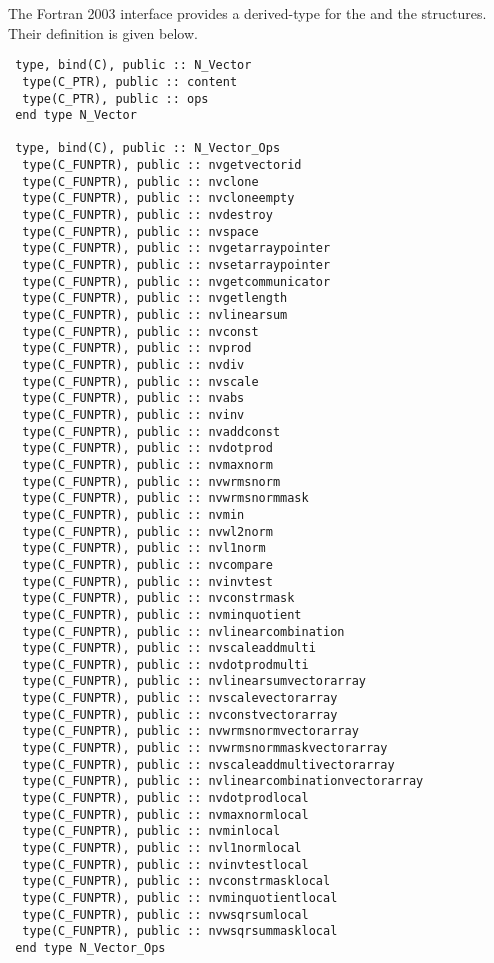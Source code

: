 The Fortran 2003 interface provides a  derived-type for the
 and the  structures.
Their definition is given below.
\begin{verbatim}
 type, bind(C), public :: N_Vector
  type(C_PTR), public :: content
  type(C_PTR), public :: ops
 end type N_Vector

 type, bind(C), public :: N_Vector_Ops
  type(C_FUNPTR), public :: nvgetvectorid
  type(C_FUNPTR), public :: nvclone
  type(C_FUNPTR), public :: nvcloneempty
  type(C_FUNPTR), public :: nvdestroy
  type(C_FUNPTR), public :: nvspace
  type(C_FUNPTR), public :: nvgetarraypointer
  type(C_FUNPTR), public :: nvsetarraypointer
  type(C_FUNPTR), public :: nvgetcommunicator
  type(C_FUNPTR), public :: nvgetlength
  type(C_FUNPTR), public :: nvlinearsum
  type(C_FUNPTR), public :: nvconst
  type(C_FUNPTR), public :: nvprod
  type(C_FUNPTR), public :: nvdiv
  type(C_FUNPTR), public :: nvscale
  type(C_FUNPTR), public :: nvabs
  type(C_FUNPTR), public :: nvinv
  type(C_FUNPTR), public :: nvaddconst
  type(C_FUNPTR), public :: nvdotprod
  type(C_FUNPTR), public :: nvmaxnorm
  type(C_FUNPTR), public :: nvwrmsnorm
  type(C_FUNPTR), public :: nvwrmsnormmask
  type(C_FUNPTR), public :: nvmin
  type(C_FUNPTR), public :: nvwl2norm
  type(C_FUNPTR), public :: nvl1norm
  type(C_FUNPTR), public :: nvcompare
  type(C_FUNPTR), public :: nvinvtest
  type(C_FUNPTR), public :: nvconstrmask
  type(C_FUNPTR), public :: nvminquotient
  type(C_FUNPTR), public :: nvlinearcombination
  type(C_FUNPTR), public :: nvscaleaddmulti
  type(C_FUNPTR), public :: nvdotprodmulti
  type(C_FUNPTR), public :: nvlinearsumvectorarray
  type(C_FUNPTR), public :: nvscalevectorarray
  type(C_FUNPTR), public :: nvconstvectorarray
  type(C_FUNPTR), public :: nvwrmsnormvectorarray
  type(C_FUNPTR), public :: nvwrmsnormmaskvectorarray
  type(C_FUNPTR), public :: nvscaleaddmultivectorarray
  type(C_FUNPTR), public :: nvlinearcombinationvectorarray
  type(C_FUNPTR), public :: nvdotprodlocal
  type(C_FUNPTR), public :: nvmaxnormlocal
  type(C_FUNPTR), public :: nvminlocal
  type(C_FUNPTR), public :: nvl1normlocal
  type(C_FUNPTR), public :: nvinvtestlocal
  type(C_FUNPTR), public :: nvconstrmasklocal
  type(C_FUNPTR), public :: nvminquotientlocal
  type(C_FUNPTR), public :: nvwsqrsumlocal
  type(C_FUNPTR), public :: nvwsqrsummasklocal
 end type N_Vector_Ops 
\end{verbatim}

